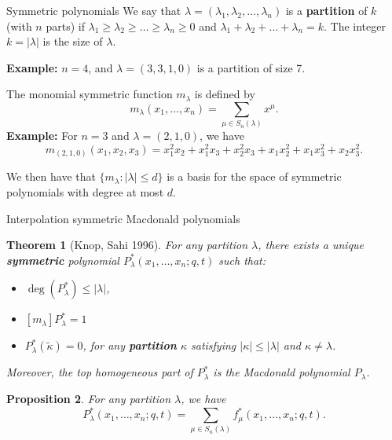 \documentclass[10pt]{beamer}
\newtheorem{thm}{Theorem}[section]
\newtheorem{prop}[thm]{Proposition}
\theoremstyle{definition}
\theoremstyle{remark}
\begin{document}
\begin{frame}{Symmetric polynomials}
We say that
       $\lambda=(\lambda_1,\lambda_2,\dots,\lambda_{n})$ is a \textbf{partition} of $k$ (with $n$ parts) if $\lambda_1\geq \lambda_2\geq \dots \geq\lambda_n\geq 0$ and $\lambda_1+\lambda_2+\dots +\lambda_n=k$.
The integer $k=|\lambda|$ is the size of $\lambda$.

    \vspace{-0.4cm}
    \textbf{\textcolor{uibred}{Example:}} $n=4$, and $\lambda=(3,3,1,0)$ is a partition of size 7.
\pause


The monomial symmetric function $m_\lambda$ is defined by
$$m_\lambda(x_1,\dots,x_n)=\sum_{\mu\in S_n(\lambda)}x^\mu.$$
 \pause
 \textbf{\textcolor{uibred}{Example:}} For $n=3$ and $\lambda=(2,1,0)$, we have
  $$m_{(2,1,0)}(x_1,x_2,x_3)=x_1^2x_2+x_1^2x_3+x_2^2x_3+x_1x_2^2+x_1x_3^2+x_2x_3^2.$$

  We then have that
$\{m_\lambda:\text{$|\lambda|\leq d$}\}$ is a basis for the space of symmetric polynomials with degree at most $d$.
  
\end{frame}









\begin{frame}{Interpolation symmetric Macdonald polynomials}


\begin{thm}[Knop, Sahi 1996]
    For any partition $\lambda$, there exists a unique \textbf{symmetric} polynomial $P^*_\lambda(x_1,\dots,x_n;q,t)$ such that:
    \begin{itemize}
        \item $\deg(P^*_\lambda)\leq |\lambda|$,
        \item $[m_\lambda]P^*_\lambda=1$
        \item $P^*_\lambda(\widetilde \kappa)=0$, for any \textbf{partition} $\kappa$ satisfying $|\kappa|\leq |\lambda|$ and $\kappa\neq \lambda$.
    \end{itemize}
    Moreover, the top homogeneous part of $P^*_\lambda$ is the Macdonald polynomial $P_\lambda$.
\end{thm}

\pause
\begin{prop}
    For any partition $\lambda$, we have $$P^*_\lambda(x_1,\dots,x_n;q,t)=\sum_{\mu\in S_n(\lambda)}f^*_\mu(x_1,\dots,x_n;q,t).$$
\end{prop}


\end{frame}
\end{document}
